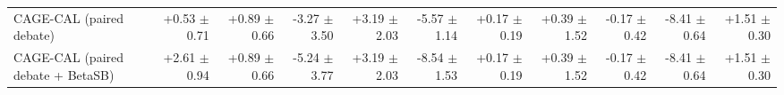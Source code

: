 \begin{tabular}{lrrrrrrrrrr}
CAGE-CAL (paired debate) & +0.53 {\scriptsize $\pm$ 0.71} & +0.89 {\scriptsize $\pm$ 0.66} & -3.27 {\scriptsize $\pm$ 3.50} & +3.19 {\scriptsize $\pm$ 2.03} & -5.57 {\scriptsize $\pm$ 1.14} & +0.17 {\scriptsize $\pm$ 0.19} & +0.39 {\scriptsize $\pm$ 1.52} & -0.17 {\scriptsize $\pm$ 0.42} & -8.41 {\scriptsize $\pm$ 0.64} & +1.51 {\scriptsize $\pm$ 0.30} \\
CAGE-CAL (paired debate + BetaSB) & +2.61 {\scriptsize $\pm$ 0.94} & +0.89 {\scriptsize $\pm$ 0.66} & -5.24 {\scriptsize $\pm$ 3.77} & +3.19 {\scriptsize $\pm$ 2.03} & -8.54 {\scriptsize $\pm$ 1.53} & +0.17 {\scriptsize $\pm$ 0.19} & +0.39 {\scriptsize $\pm$ 1.52} & -0.17 {\scriptsize $\pm$ 0.42} & -8.41 {\scriptsize $\pm$ 0.64} & +1.51 {\scriptsize $\pm$ 0.30} \\
\bottomrule
\end{tabular}
